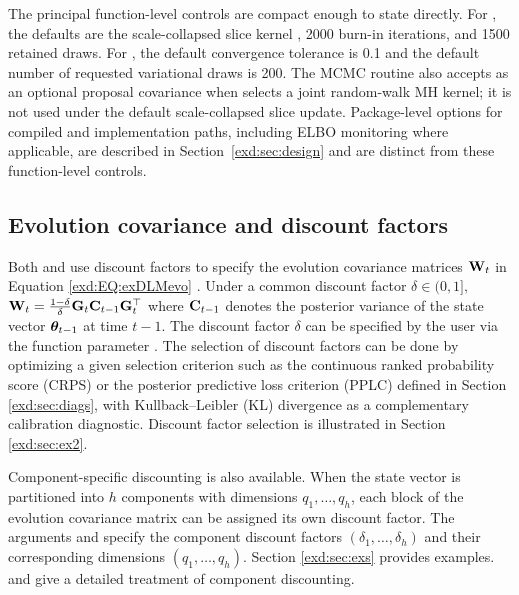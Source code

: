 The principal function-level controls are compact enough to state directly.
For , the defaults are the scale-collapsed slice kernel
, 2000 burn-in iterations, and 1500 retained
draws. For , the default convergence tolerance is 0.1 and
the default number of requested variational draws is 200. The MCMC routine also
accepts  as an optional proposal covariance when
 selects a joint random-walk MH kernel; it is not used under
the default scale-collapsed slice update. Package-level options for compiled
and  implementation paths, including ELBO monitoring where applicable, are
described in Section~\ref{exd:sec:design} and are distinct from these
function-level controls.


\subsection{Evolution covariance and discount factors}
\label{exd:sec:dfs}

Both  and  use discount factors to specify the evolution covariance matrices $\mathbf{W}_t$ in Equation \eqref{exd:EQ:exDLMevo} \citep[see][and references therein]{exd-west1997bayesian,env-prado2021time}. Under a common discount factor $\delta \in (0,1],$ $\mathbf{W}_t = \frac{1-\delta}{\delta} \mathbf{G}_t \mathbf{C}_{t-1} \mathbf{G}_t^\top$ where $\mathbf{C}_{t-1}$ denotes the posterior variance of the state vector $\boldsymbol{\theta}_{t-1}$ at time $t-1$. The discount factor $\delta$ can be specified by the user via the function parameter . The selection of discount factors can be done by optimizing a given selection criterion such as the continuous ranked probability score (CRPS) or the posterior predictive loss criterion (PPLC) defined in Section \ref{exd:sec:diags}, with Kullback--Leibler (KL) divergence as a complementary calibration diagnostic.  Discount factor selection is illustrated in Section \ref{exd:sec:ex2}.

Component-specific discounting is also available. When the state vector is partitioned into $h$ components with dimensions $q_1,\ldots,q_h$, each block of the evolution covariance matrix can be assigned its own discount factor.
The arguments  and  specify the component discount factors $(\delta_1,\dots,\delta_h)$ and their corresponding dimensions $(q_1,\dots,q_h)$.  Section \ref{exd:sec:exs} provides examples.  \cite{exd-west1997bayesian} and \cite{env-prado2021time} give a detailed treatment of component discounting.

